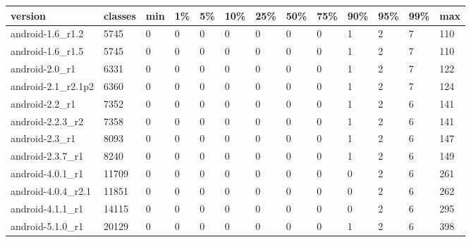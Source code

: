 \begin{tabular}{|l|l|l|l|l|l|l|l|l|l|l|l|l|}
\hline
version&classes&min&1\%&5\%&10\%&25\%&50\%&75\%&90\%&95\%&99\%&max\\
\hline
android-1.6\_r1.2&5745&0&0&0&0&0&0&0&1&2&7&110\\
\hline
android-1.6\_r1.5&5745&0&0&0&0&0&0&0&1&2&7&110\\
\hline
android-2.0\_r1&6331&0&0&0&0&0&0&0&1&2&7&122\\
\hline
android-2.1\_r2.1p2&6360&0&0&0&0&0&0&0&1&2&7&124\\
\hline
android-2.2\_r1&7352&0&0&0&0&0&0&0&1&2&6&141\\
\hline
android-2.2.3\_r2&7358&0&0&0&0&0&0&0&1&2&6&141\\
\hline
android-2.3\_r1&8093&0&0&0&0&0&0&0&1&2&6&147\\
\hline
android-2.3.7\_r1&8240&0&0&0&0&0&0&0&1&2&6&149\\
\hline
android-4.0.1\_r1&11709&0&0&0&0&0&0&0&0&2&6&261\\
\hline
android-4.0.4\_r2.1&11851&0&0&0&0&0&0&0&0&2&6&262\\
\hline
android-4.1.1\_r1&14115&0&0&0&0&0&0&0&0&2&6&295\\
\hline
android-5.1.0\_r1&20129&0&0&0&0&0&0&0&1&2&6&398\\
\hline
\end{tabular}
